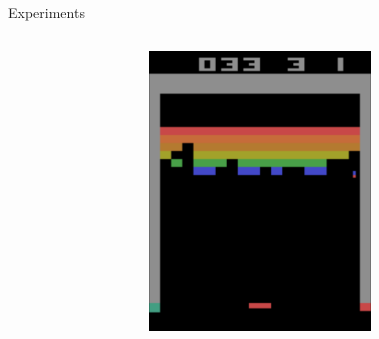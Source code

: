\begin{frame}{Experiments}
\begin{columns}[c,onlytextwidth]
\begin{figure}
        \end{figure}
        \begin{figure}
            \includegraphics[width=\textwidth]{images/atari-sequence-1.png}
        \end{figure}
        \begin{figure}

\end{figure}
\end{columns}
\end{frame}
